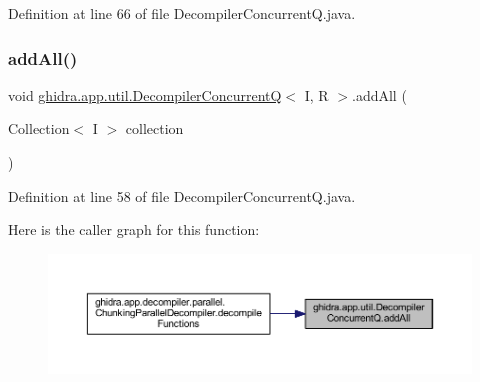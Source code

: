 Definition at line 66 of file Decompiler\+Concurrent\+Q.\+java.

\mbox{\label{classghidra_1_1app_1_1util_1_1_decompiler_concurrent_q_a4cbd1eb45068fd62baea390f86a56aee}} 
\subsubsection{\texorpdfstring{addAll()}{addAll()}\hspace{0.1cm}{\footnotesize\ttfamily [1/2]}}
{\footnotesize\ttfamily void \mbox{\hyperlink{classghidra_1_1app_1_1util_1_1_decompiler_concurrent_q}{ghidra.\+app.\+util.\+Decompiler\+ConcurrentQ}}$<$ I, R $>$.add\+All (\begin{DoxyParamCaption}\item[{Collection$<$ I $>$}]{collection }\end{DoxyParamCaption})\hspace{0.3cm}{\ttfamily [inline]}}



Definition at line 58 of file Decompiler\+Concurrent\+Q.\+java.

Here is the caller graph for this function\+:
\nopagebreak
\begin{figure}[H]
\begin{center}
\leavevmode
\includegraphics[width=350pt]{classghidra_1_1app_1_1util_1_1_decompiler_concurrent_q_a4cbd1eb45068fd62baea390f86a56aee_icgraph}
\end{center}
\end{figure}
\mbox{\label{classghidra_1_1app_1_1util_1_1_decompiler_concurrent_q_ad6e5fbfe57c6eb842a9d3e4c8cda333d}} 
